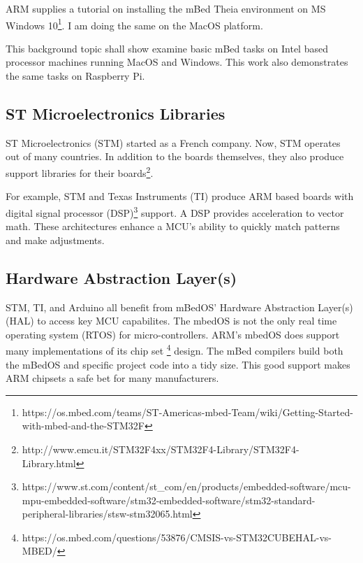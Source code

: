 \documentclass{article}
\begin{document}
ARM supplies a tutorial on installing the mBed Theia environment on MS Windows 10\footnote{https://os.mbed.com/teams/ST-Americas-mbed-Team/wiki/Getting-Started-with-mbed-and-the-STM32F}.  I am doing the same on the MacOS platform.  %

This background topic shall show examine basic mBed tasks on Intel based processor machines running MacOS and Windows.  This work also demonstrates the same tasks on Raspberry Pi.  %


\subsection{ST Microelectronics Libraries} %
\label{sub:st_microelectronics_libraries}

ST Microelectronics (STM) started as a French company. Now, STM operates out of many countries. In addition to the boards themselves, they also produce support libraries for their boards\footnote{http://www.emcu.it/STM32F4xx/STM32F4-Library/STM32F4-Library.html}. 

For example, STM and Texas Instruments (TI) produce ARM based boards with digital signal processor (DSP)\footnote{https://www.st.com/content/st\_com/en/products/embedded-software/mcu-mpu-embedded-software/stm32-embedded-software/stm32-standard-peripheral-libraries/stsw-stm32065.html} support.  A DSP provides acceleration to vector math.  These architectures enhance a MCU's ability to quickly match patterns and make adjustments.






\newpage
\subsection{Hardware Abstraction Layer(s)} %
\label{sub:hardware_abstraction_layer_s}

STM, TI, and Arduino all benefit from mBedOS' Hardware Abstraction Layer(s)(HAL) to access key MCU capabilites.  The mbedOS is not the only real time operating system (RTOS) for micro-controllers.  ARM's mbedOS does support many implementations of its chip set \footnote{https://os.mbed.com/questions/53876/CMSIS-vs-STM32CUBEHAL-vs-MBED/} design.  The mBed compilers build both the mBedOS and specific project code into a tidy size.  This good support makes ARM chipsets a safe bet for many manufacturers.
\end{document}
